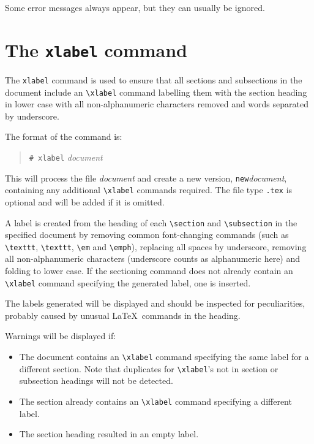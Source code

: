 \documentclass[twoside,11pt]{article}
\newcommand{\xlabel}[1]{}
\renewcommand{\_}{\texttt{\symbol{95}}}
\begin{document}
Some error messages always appear, but they can usually be ignored.

\newpage
\section{\xlabel{the_xlabel_command}\label{xlabel}The \texttt{xlabel} command}
The \texttt{xlabel} command is used to ensure that all sections and subsections
in the document include an \verb+\xlabel+ command labelling them with the
section heading in lower case with all non-alphanumeric characters removed and
words separated by underscore.

The format of the command is:
\begin{quote}
\verb+# xlabel+ \textit{document}
\end{quote}

This will process the file \textit{document} and create a new version,
\texttt{new}\textit{document}, containing any additional \verb+\xlabel+
commands required. The file type \texttt{.tex} is optional and will be added
if it is omitted.

A label is created from the heading of each \verb+\section+ and
\verb+\subsection+ in the specified document by removing common font-changing
commands (such as \verb+\texttt+, \verb+\texttt+, \verb+\em+ and \verb+\emph+),
replacing all spaces by underscore, removing all non-alphanumeric characters
(underscore counts as alphanumeric here) and folding to lower case.
If the sectioning command does not already contain an \verb+\xlabel+ command
specifying the generated label, one is inserted.

The labels generated will be displayed and should be inspected for
peculiarities, probably caused by unusual \LaTeX\ commands in the heading.

Warnings will be displayed if:
\begin{itemize}
\item The document contains an \verb+\xlabel+ command specifying the same
label for a different section. Note that duplicates for \verb+\xlabel+'s not
in section or subsection headings will not be detected.
\item The section already contains an \verb+\xlabel+ command specifying
a different label.
\item The section heading resulted in an empty label.
\end{itemize}
\end{document}
